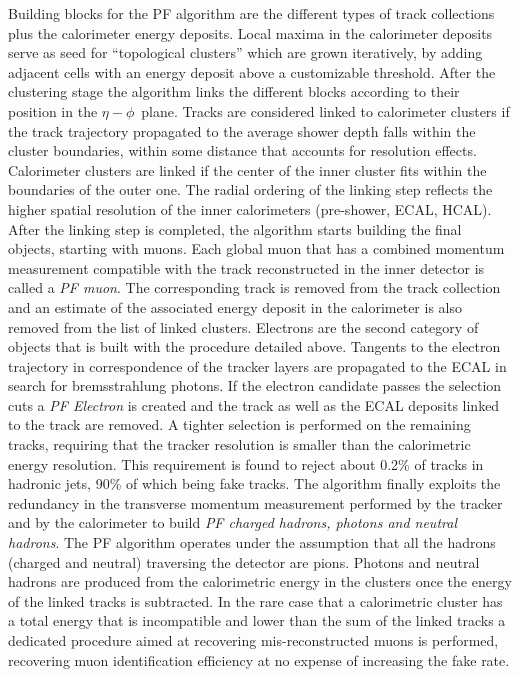 Building blocks for the PF algorithm are the different types of track collections plus the calorimeter energy deposits. Local maxima in the calorimeter deposits serve as seed for ``topological clusters'' which are grown iteratively, by adding adjacent cells with an energy deposit above a customizable threshold. After the clustering stage the algorithm links the different blocks according to their position in the $\eta-\phi$\ plane. Tracks are considered linked to calorimeter clusters if the track trajectory propagated to the average shower depth falls within the cluster boundaries, within some distance that accounts for resolution effects. Calorimeter clusters are linked if the center of the inner cluster fits within the boundaries of the outer one. The radial ordering of the linking step reflects the higher spatial resolution of the inner calorimeters (pre-shower, ECAL, HCAL). After the linking step is completed, the algorithm starts building the final objects, starting with muons. Each global muon that has a combined momentum measurement compatible with the track reconstructed in the inner detector is called a \emph{PF muon}. The corresponding track is removed from the track collection and an estimate of the associated energy deposit in the calorimeter is also removed from the list of linked clusters. Electrons are the second category of objects that is built with the procedure detailed above. Tangents to the electron trajectory in correspondence of the tracker layers are propagated to the ECAL in search for bremsstrahlung photons. If the electron candidate passes the selection cuts a \emph{PF Electron} is created and the track as well as the ECAL deposits linked to the track are removed. A tighter selection is performed on the remaining tracks, requiring that the tracker \pT resolution is smaller than the calorimetric energy resolution. This requirement is found to reject about 0.2\% of tracks in hadronic jets, 90\% of which being fake tracks. 
The algorithm finally exploits the redundancy in the transverse momentum measurement performed by the tracker and by the calorimeter to build \emph{PF charged hadrons, photons and neutral hadrons}. The PF algorithm operates under the assumption that all the hadrons (charged and neutral) traversing the detector are pions. Photons and neutral hadrons are produced from the calorimetric energy in the clusters once the energy of the linked tracks is subtracted. In the rare case that a calorimetric cluster has a total energy that is incompatible and lower than the sum of the linked tracks a dedicated procedure aimed at recovering mis-reconstructed muons is performed, recovering muon identification efficiency at no expense of increasing the fake rate.%


